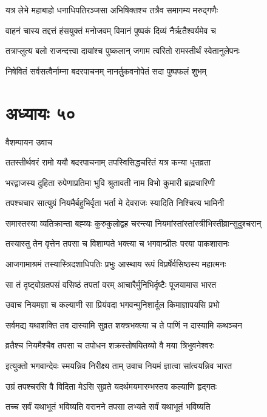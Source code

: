 \twolineshloka
{यत्र लेभे महाबाहो धनाधिपतिरञ्जसा}
{अभिषिक्तश्च तत्रैव समागम्य मरुद्गणैः}


\twolineshloka
{वाहनं चास्य तद्दत्तं हंसयुक्तं मनोजवम्}
{विमानं पुष्पकं दिव्यं नैर्ऋतैश्वर्यमेव च}


\twolineshloka
{तत्राप्लुत्य बलो राजन्दत्त्वा दायांश्च पुष्कलान्}
{जगाम त्वरितो रामस्तीर्थं स्वेतानुलेपनः}


\twolineshloka
{निषेवितं सर्वसत्वैर्नाम्ना बदरपाचनम्}
{नानर्तुकवनोपेतं सदा पुष्पफलं शुभम्}


\chapter{अध्यायः ५०}
\twolineshloka
{वैशम्पायन उवाच}
{}


\twolineshloka
{ततस्तीर्थवरं रामो ययौ बदरपाचनाम्}
{तपस्विसिद्धचरितं यत्र कन्या धृतव्रता}


\twolineshloka
{भरद्वाजस्य दुहिता रुपेणाप्रतिमा भुवि}
{श्रुतावती नाम विभो कुमारी ब्रह्मचारिणी}


\twolineshloka
{तपश्चचार सात्युग्रं नियमैर्बहुभिर्वृता}
{भर्ता मे देवराजः स्यादिति निश्चित्य भामिनी}


\twolineshloka
{समास्तस्या व्यतिक्रान्ता बह्व्यः कुरुकुलोद्वह}
{चरन्त्या नियमांस्तांस्तांस्त्रीभिस्तीव्रान्सुदुश्चरान्}


\twolineshloka
{तस्यास्तु तेन वृत्तेन तपसा च विशाम्पते}
{भक्त्या च भगवान्प्रीतः परया पाकशासनः}


\twolineshloka
{आजगामाश्रमं तस्यास्त्रिदशाधिपतिः प्रभुः}
{आस्थाय रूपं विप्रर्षेर्वसिष्ठस्य महात्मनः}


\twolineshloka
{सा तं दृष्ट्वोग्रतपसं वसिष्ठं तपतां वरम्}
{आचारैर्मुनिभिर्दृष्टैः पूजयामास भारत}


\twolineshloka
{उवाच नियमज्ञा च कल्याणी सा प्रियंवदा}
{भगवन्मुनिशार्दूल किमाज्ञापयसि प्रभो}


\twolineshloka
{सर्वमद्य यथाशक्ति तव दास्यामि सुव्रत}
{शक्त्रभक्त्या च ते पाणिं न दास्यामि कथञ्चन}


\twolineshloka
{व्रतैश्च नियमैश्चैव तपसा च तपोधन}
{शक्रस्तोषयितव्यो वै मया त्रिभुवनेश्वरः}


\twolineshloka
{इत्युक्तो भगवान्देवः स्मयन्निव निरीक्ष्य ताम्}
{उवाच नियमं ज्ञात्वा सांत्वयन्निव भारत}


\twolineshloka
{उग्रं तपश्चरसि वै विदिता मेऽसि सुव्रते}
{यदर्थमयमारम्भस्तव कल्याणि हृद्गतः}


\twolineshloka
{तच्च सर्वं यथाभूतं भविष्यति वरानने}
{तपसा लभ्यते सर्वं यथाभूतं भविष्यति}


